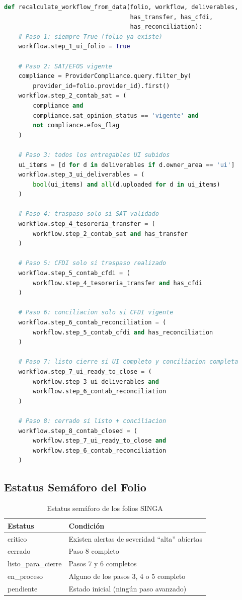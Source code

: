 \documentclass[12pt,a4paper]{article}
\begin{document}
\begin{lstlisting}[language=Python, caption={Recalculo del workflow -- services.py}]
def recalculate_workflow_from_data(folio, workflow, deliverables,
                                   has_transfer, has_cfdi,
                                   has_reconciliation):
    # Paso 1: siempre True (folio ya existe)
    workflow.step_1_ui_folio = True

    # Paso 2: SAT/EFOS vigente
    compliance = ProviderCompliance.query.filter_by(
        provider_id=folio.provider_id).first()
    workflow.step_2_contab_sat = (
        compliance and
        compliance.sat_opinion_status == 'vigente' and
        not compliance.efos_flag
    )

    # Paso 3: todos los entregables UI subidos
    ui_items = [d for d in deliverables if d.owner_area == 'ui']
    workflow.step_3_ui_deliverables = (
        bool(ui_items) and all(d.uploaded for d in ui_items)
    )

    # Paso 4: traspaso solo si SAT validado
    workflow.step_4_tesoreria_transfer = (
        workflow.step_2_contab_sat and has_transfer
    )

    # Paso 5: CFDI solo si traspaso realizado
    workflow.step_5_contab_cfdi = (
        workflow.step_4_tesoreria_transfer and has_cfdi
    )

    # Paso 6: conciliacion solo si CFDI vigente
    workflow.step_6_contab_reconciliation = (
        workflow.step_5_contab_cfdi and has_reconciliation
    )

    # Paso 7: listo cierre si UI completo y conciliacion completa
    workflow.step_7_ui_ready_to_close = (
        workflow.step_3_ui_deliverables and
        workflow.step_6_contab_reconciliation
    )

    # Paso 8: cerrado si listo + conciliacion
    workflow.step_8_contab_closed = (
        workflow.step_7_ui_ready_to_close and
        workflow.step_6_contab_reconciliation
    )
\end{lstlisting}

\subsection{Estatus Sem\'aforo del Folio}

\begin{table}[h!]
\centering
\begin{tabularx}{\textwidth}{>{\ttfamily}lX}
\toprule
\textbf{Estatus} & \textbf{Condici\'on} \\
\midrule
critico             & Existen alertas de severidad ``alta'' abiertas \\
cerrado             & Paso 8 completo \\
listo\_para\_cierre & Pasos 7 y 6 completos \\
en\_proceso         & Alguno de los pasos 3, 4 o 5 completo \\
pendiente           & Estado inicial (ning\'un paso avanzado) \\
\bottomrule
\end{tabularx}
\caption{Estatus sem\'aforo de los folios SINGA}
\end{table}
\end{document}
